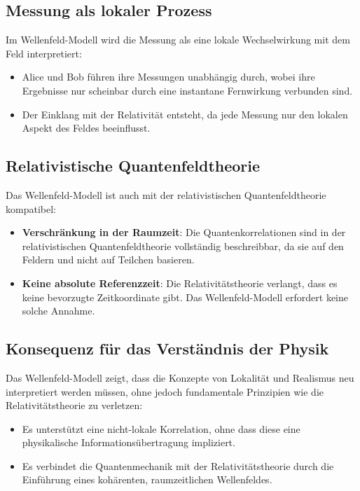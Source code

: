 \documentclass[12pt,a4paper]{article}
\begin{document}
	\subsection{Messung als lokaler Prozess}
	
	Im Wellenfeld-Modell wird die Messung als eine lokale Wechselwirkung mit dem Feld interpretiert:
	\begin{itemize}
		\item Alice und Bob führen ihre Messungen unabhängig durch, wobei ihre Ergebnisse nur scheinbar durch eine instantane Fernwirkung verbunden sind.
		\item Der Einklang mit der Relativität entsteht, da jede Messung nur den lokalen Aspekt des Feldes beeinflusst.
	\end{itemize}
	
	\subsection{Relativistische Quantenfeldtheorie}
	
	Das Wellenfeld-Modell ist auch mit der relativistischen Quantenfeldtheorie kompatibel:
	\begin{itemize}
		\item \textbf{Verschränkung in der Raumzeit}: Die Quantenkorrelationen sind in der relativistischen Quantenfeldtheorie vollständig beschreibbar, da sie auf den Feldern und nicht auf Teilchen basieren.
		\item \textbf{Keine absolute Referenzzeit}: Die Relativitätstheorie verlangt, dass es keine bevorzugte Zeitkoordinate gibt. Das Wellenfeld-Modell erfordert keine solche Annahme.
	\end{itemize}
	
	\subsection{Konsequenz für das Verständnis der Physik}
	
	Das Wellenfeld-Modell zeigt, dass die Konzepte von Lokalität und Realismus neu interpretiert werden müssen, ohne jedoch fundamentale Prinzipien wie die Relativitätstheorie zu verletzen:
	\begin{itemize}
		\item Es unterstützt eine nicht-lokale Korrelation, ohne dass diese eine physikalische Informationsübertragung impliziert.
		\item Es verbindet die Quantenmechanik mit der Relativitätstheorie durch die Einführung eines kohärenten, raumzeitlichen Wellenfeldes.
	\end{itemize}
	
\end{document}
